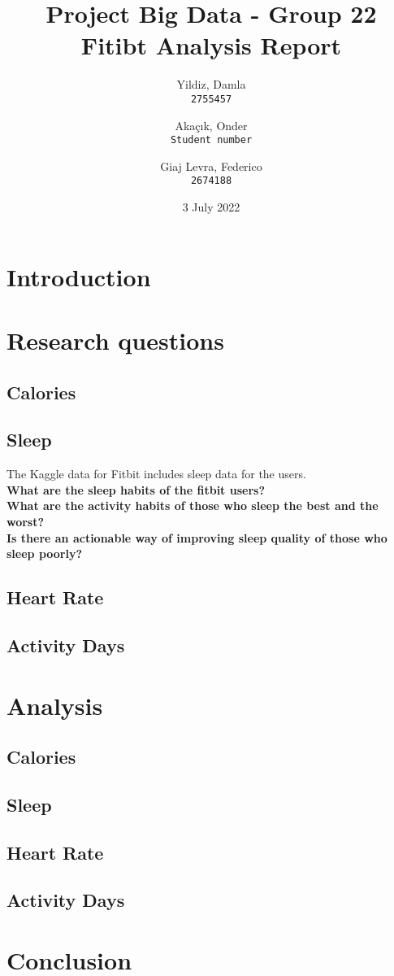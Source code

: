 \documentclass{report}
\title{Project Big Data - Group 22\\[2ex]
Fitibt Analysis Report}
\author{
  Yildiz, Damla\\
  \texttt{2755457}
  \and
  Akaçık, Onder\\
  \texttt{Student number}
  \and
  Giaj Levra, Federico\\
  \texttt{2674188}
}
\date{3 July 2022}
\begin{document}
\maketitle
\tableofcontents
\section{Introduction}
\cite{og_data} %
\cite{kg_data} %
\section{Research questions}
\subsection{Calories}
\subsection{Sleep}
The Kaggle data for Fitbit includes sleep data for the users. \\
\textbf{What are the sleep habits of the fitbit users?} \\
\textbf{What are the activity habits of those who sleep the best and the worst?} \\
\textbf{Is there an actionable way of improving sleep quality of those who sleep poorly?} \\
\subsection{Heart Rate}
\subsection{Activity Days}

\section{Analysis}
\subsection{Calories}
\subsection{Sleep}
\subsection{Heart Rate}
\subsection{Activity Days}

\section{Conclusion}



 
 
\end{document}
